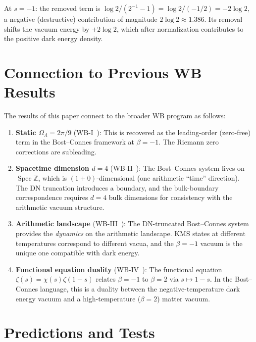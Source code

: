 \documentclass[12pt,a4paper]{article}
\newcommand{\Spec}{\operatorname{Spec}}
\newcommand{\OL}{\Omega_\Lambda}
\begin{document}
At $s = -1$: the removed term is $\log 2/(2^{-1}-1) = \log 2/(-1/2) = -2\log 2$, a negative (destructive) contribution of magnitude $2\log 2 \approx 1.386$. Its removal shifts the vacuum energy by $+2\log 2$, which after normalization contributes to the positive dark energy density.

\section{Connection to Previous WB Results}
\label{sec:connection}

The results of this paper connect to the broader WB program as follows:

\begin{enumerate}[label=(\roman*)]
\item \textbf{Static $\OL = 2\pi/9$} (WB-I~\cite{WB-I}): This is recovered as the leading-order (zero-free) term in the Bost--Connes framework at $\beta = -1$. The Riemann zero corrections are subleading.

\item \textbf{Spacetime dimension $d=4$} (WB-II~\cite{WB-II}): The Bost--Connes system lives on $\Spec\mathbb{Z}$, which is $(1+0)$-dimensional (one arithmetic ``time'' direction). The DN truncation introduces a boundary, and the bulk-boundary correspondence requires $d = 4$ bulk dimensions for consistency with the arithmetic vacuum structure.

\item \textbf{Arithmetic landscape} (WB-III~\cite{WB-III}): The DN-truncated Bost--Connes system provides the \emph{dynamics} on the arithmetic landscape. KMS states at different temperatures correspond to different vacua, and the $\beta = -1$ vacuum is the unique one compatible with dark energy.

\item \textbf{Functional equation duality} (WB-IV~\cite{WB-IV}): The functional equation $\zeta(s) = \chi(s)\zeta(1-s)$ relates $\beta = -1$ to $\beta = 2$ via $s \mapsto 1-s$. In the Bost--Connes language, this is a duality between the negative-temperature dark energy vacuum and a high-temperature ($\beta = 2$) matter vacuum.
\end{enumerate}

\section{Predictions and Tests}
\label{sec:predictions}
\end{document}
